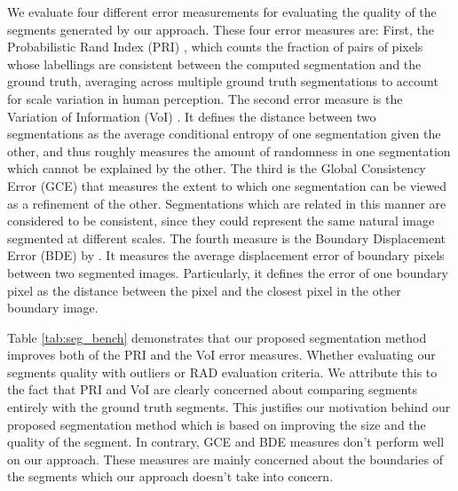 \documentclass{llncs}
\begin{document}
We evaluate four different error measurements for evaluating the quality of the segments
generated by our approach. These four error measures are: First, the Probabilistic Rand Index
(PRI) \cite{Unnikrishnan_2007_5789}, which counts the fraction of pairs of pixels whose labellings are
consistent between the computed segmentation and the ground truth, averaging across
multiple ground truth segmentations to account for scale variation in human perception.
The second error measure is the Variation of Information (VoI) \cite{citeulike:3906686}.
It defines the distance between two segmentations as the average conditional entropy
of one segmentation given the other, and thus roughly measures the amount of randomness
in one segmentation which cannot be explained by the other. The third is the Global
Consistency Error (GCE) \cite{MartinFTM01} that measures the extent to which one
segmentation can be viewed as a refinement of the other. Segmentations which are related
in this manner are considered to be consistent, since they could represent the same
natural image segmented at different scales. The fourth measure is the Boundary
Displacement Error (BDE) by \cite{649319}. It measures the average displacement error of
boundary pixels between two segmented images. Particularly, it defines the error of one
boundary pixel as the distance between the pixel and the closest pixel in the other
boundary image.

Table \ref{tab:seg_bench} demonstrates that our proposed segmentation method improves both of the
PRI and the VoI error measures. Whether evaluating our segments quality with outliers or RAD evaluation criteria.
We attribute this to the fact that  PRI and VoI are clearly concerned about comparing segments entirely with the ground truth segments.
This justifies our motivation behind our proposed segmentation method which is based on improving the size and the quality of the segment.
In contrary, GCE and BDE measures don't perform well on our approach.
These measures are mainly concerned about the boundaries of the segments which our approach doesn't take into concern.
\end{document}
